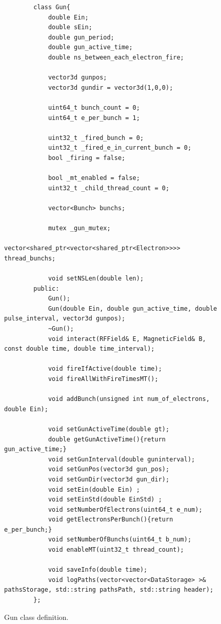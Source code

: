 \documentclass[a4paper,oneside,12pt]{report}
\numberwithin{equation}{chapter}
\begin{document}
\begin{figure}[H]
    \centering
    \begin{verbatim}
        class Gun{
            double Ein;
            double sEin;
            double gun_period;
            double gun_active_time;
            double ns_between_each_electron_fire;

            vector3d gunpos;
            vector3d gundir = vector3d(1,0,0);

            uint64_t bunch_count = 0;
            uint64_t e_per_bunch = 1;

            uint32_t _fired_bunch = 0;
            uint32_t _fired_e_in_current_bunch = 0;
            bool _firing = false;

            bool _mt_enabled = false;
            uint32_t _child_thread_count = 0;

            vector<Bunch> bunchs;

            mutex _gun_mutex; 
            vector<shared_ptr<vector<shared_ptr<Electron>>>> thread_bunchs;

            void setNSLen(double len);
        public:
            Gun();
            Gun(double Ein, double gun_active_time, double pulse_interval, vector3d gunpos);
            ~Gun();
            void interact(RFField& E, MagneticField& B, const double time, double time_interval);

            void fireIfActive(double time);
            void fireAllWithFireTimesMT();
            
            void addBunch(unsigned int num_of_electrons, double Ein);

            void setGunActiveTime(double gt);
            double getGunActiveTime(){return gun_active_time;}
            void setGunInterval(double guninterval);
            void setGunPos(vector3d gun_pos);
            void setGunDir(vector3d gun_dir);
            void setEin(double Ein) ;
            void setEinStd(double EinStd) ;
            void setNumberOfElectrons(uint64_t e_num);
            void getElectronsPerBunch(){return e_per_bunch;}
            void setNumberOfBunchs(uint64_t b_num);
            void enableMT(uint32_t thread_count);
            
            void saveInfo(double time);
            void logPaths(vector<vector<DataStorage> >& pathsStorage, std::string pathsPath, std::string header);
        };
    \end{verbatim}
    \vspace{20pt}
    \caption{Gun class definition.}
    \label{fig:gun_class}
\end{figure}
\end{document}
